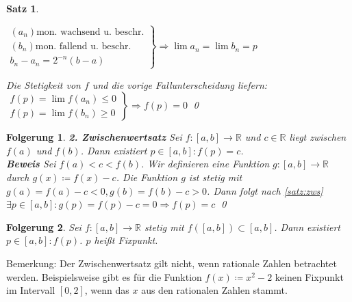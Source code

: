\documentclass[ngerman,titlepage,twoside, parskip=half*]{scrreprt}
\newcommand*{\R}{\mathbb{R}}
\theoremstyle{break}
\newtheorem{theorem}{Satz}[section]
\newtheorem{Folg}{Folgerung}[chapter]
\theoremstyle{nonumberbreak}
\begin{document}
\begin{theorem}
\begin{enumerate}[1. F{a}ll]
\begin{enumerate}[(i)]
    \end{enumerate}
    $\left.\begin{array}{rcl}
      (a_n) \text{mon. wachsend u. beschr.}\\
      (b_n) \text{mon. fallend u. beschr.}\\
      b_n-a_n=2^{-n}(b-a)
    \end{array}\right\}\Rightarrow \lim a_n=\lim b_n=p$
\end{enumerate}
Die Stetigkeit von $f$ und die vorige Fallunterscheidung liefern:\\
$\left.\begin{array}{rcl}
  f(p)=\lim f(a_n)\leq 0\\
  f(p)=\lim f(b_n)\geq 0
\end{array}\right\}\Rightarrow f(p)=0$
\qed
\end{theorem}

\begin{Folg}
\textbf{2. Zwischenwertsatz} Sei $f\colon[a,b]\rightarrow\R$ und $c\in \R$ liegt zwischen $f(a)$ und $f(b)$. Dann existiert
$p\in[a,b]\colon f(p)=c$.\\
\textbf{Beweis} Sei $f(a)<c<f(b)$. Wir definieren eine Funktion
  $g\colon[a,b]\rightarrow \R$ durch $g(x)\coloneqq f(x)-c$. Die
Funktion $g$ ist stetig mit $g(a)=f(a)-c<0, g(b)=f(b)-c>0$. Dann folgt nach \autoref{satz:zws} $\exists p\in[a,b]
\colon g(p)=f(p)-c=0\Rightarrow f(p)=c$
\qed
\end{Folg}

\begin{Folg}
Sei $f\colon[a,b]\rightarrow\R$ stetig mit $f([a,b])\subset [a,b]$. Dann existiert $p\in [a,b]\colon f(p)$. $p$ heißt
\emph{Fixpunkt}.
\end{Folg}

Bemerkung: Der Zwischenwertsatz gilt nicht, wenn rationale Zahlen betrachtet werden. Beispielsweise gibt es für
die Funktion $f(x)\coloneqq x^2-2$ keinen Fixpunkt im Intervall $[0,2]$, wenn das $x$ aus den rationalen Zahlen stammt.
\end{document}
